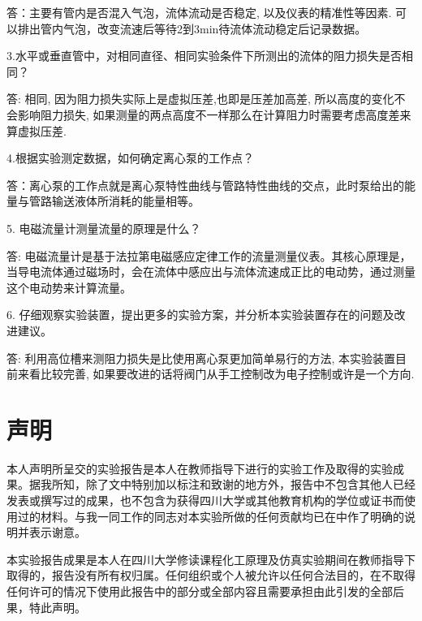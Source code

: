 \documentclass[a4paper,UTF8]{ctexrep}
\theoremstyle{plain}
\theoremstyle{definition}
\numberwithin{equation}{chapter}
\begin{document}
    答：主要有管内是否混入气泡，流体流动是否稳定, 以及仪表的精准性等因素. 可以排出管内气泡，改变流速后等待2到3min待流体流动稳定后记录数据。

    3.水平或垂直管中，对相同直径、相同实验条件下所测出的流体的阻力损失是否相同？

    答: 相同, 因为阻力损失实际上是虚拟压差,也即是压差加高差, 所以高度的变化不会影响阻力损失, 如果测量的两点高度不一样那么在计算阻力时需要考虑高度差来算虚拟压差.

    4.根据实验测定数据，如何确定离心泵的工作点？
    
    答：离心泵的工作点就是离心泵特性曲线与管路特性曲线的交点，此时泵给出的能量与管路输送液体所消耗的能量相等。

    5. 电磁流量计测量流量的原理是什么？

    答: 电磁流量计是基于法拉第电磁感应定律工作的流量测量仪表。其核心原理是，当导电流体通过磁场时，会在流体中感应出与流体流速成正比的电动势，通过测量这个电动势来计算流量。

    6. 仔细观察实验装置，提出更多的实验方案，并分析本实验装置存在的问题及改进建议。

    答: 利用高位槽来测阻力损失是比使用离心泵更加简单易行的方法, 本实验装置目前来看比较完善, 如果要改进的话将阀门从手工控制改为电子控制或许是一个方向. 
	
	
	
	
	\section*{声\hspace{0.8cm}明}


	本人声明所呈交的实验报告是本人在教师指导下进行的实验工作及取得的实验成果。据我所知，除了文中特别加以标注和致谢的地方外，报告中不包含其他人已经发表或撰写过的成果，也不包含为获得四川大学或其他教育机构的学位或证书而使用过的材料。与我一同工作的同志对本实验所做的任何贡献均已在中作了明确的说明并表示谢意。
	
	本实验报告成果是本人在四川大学修读课程化工原理及仿真实验期间在教师指导下取得的，报告没有所有权归属。任何组织或个人被允许以任何合法目的，在不取得任何许可的情况下使用此报告中的部分或全部内容且需要承担由此引发的全部后果，特此声明。
	
\end{document}

